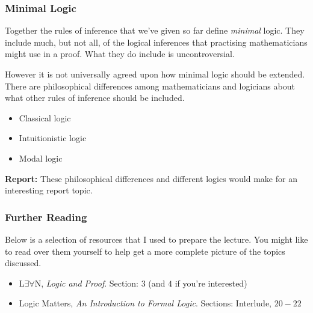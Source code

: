 \documentclass{beamer}
\theoremstyle{indentDefn} \newtheorem{defn}[]{Definition}
\begin{document}
\begin{frame}
	\frametitle{Minimal Logic}
	
	Together the rules of inference that we've given so far define \emph{minimal} logic. They include much, but not all, of the logical inferences that practising mathematicians might use in a proof. What they do include is uncontroversial.
	
	\vspace{0.5cm}
	
	However it is not universally agreed upon how minimal logic should be extended. There are philosophical differences among mathematicians and logicians about what other rules of inference should be included. 
	
	\begin{itemize}
		\item Classical logic 
		\item Intuitionistic logic
		\item Modal logic		
	\end{itemize}
	
	{\bf Report:} These philosophical differences and different logics would make for an interesting report topic. 
	
\end{frame}

\begin{frame}
  \frametitle{Further Reading}


Below is a selection of resources that I used to prepare the lecture. You might like to read over them yourself to help get a more complete picture of the topics discussed. 

\vspace{0.5cm}

\begin{itemize}
	\item L$\exists \forall$N, \emph{Logic and Proof}. Section: $3$ (and $4$ if you're interested)  
	\item Logic Matters, \emph{An Introduction to Formal Logic}. Sections: Interlude, $20 - 22$
\end{itemize}

\end{frame}
\end{document}
